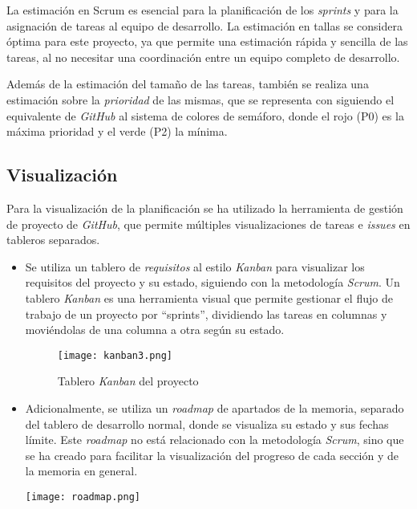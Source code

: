La estimación en Scrum es esencial para la planificación de los \textit{sprints}
y para la asignación de tareas al equipo de desarrollo. La estimación en tallas
se considera óptima para este proyecto, ya que permite una estimación rápida y
sencilla de las tareas, al no necesitar una coordinación entre un equipo
completo de desarrollo.

Además de la estimación del tamaño de las tareas, también se realiza una
estimación sobre la \textit{prioridad} de las mismas, que se representa con %
siguiendo el equivalente de \textit{GitHub} al sistema de colores de semáforo,
donde el rojo (P0) es la máxima prioridad y el verde (P2) la mínima.

\newpage{}
\subsection{Visualización}\label{subsec:visual_planif}
Para la visualización de la planificación se ha utilizado la herramienta de
gestión de proyecto de \textit{GitHub}, que permite múltiples visualizaciones de
tareas e \textit{issues} en tableros separados.

\begin{itemize}
	\item Se utiliza un tablero de \textit{requisitos} al estilo \textit{Kanban}
		para visualizar los requisitos del proyecto y su estado, siguiendo con
		la metodología \textit{Scrum}. Un tablero \textit{Kanban} es una
		herramienta visual que permite gestionar el flujo de trabajo de un
		proyecto por ``sprints'', dividiendo las tareas en columnas y
		moviéndolas de una columna a otra según su estado.

		\begin{figure}[H]
			\centering
			\texttt{[image: kanban3.png]}
			\caption{Tablero \textit{Kanban} del proyecto}
			\label{fig:kanban}
		\end{figure}
	\item Adicionalmente, se utiliza un \textit{roadmap} de apartados de la
		memoria, separado del tablero de desarrollo normal, donde se visualiza
		su estado y sus fechas límite. Este \textit{roadmap} no está relacionado
		con la metodología \textit{Scrum}, sino que se ha creado para facilitar
		la visualización del progreso de cada sección y de la memoria en general.

		\begin{minipage}{\linewidth}
			\centering
			\texttt{[image: roadmap.png]}
		\end{minipage}
\end{itemize}


